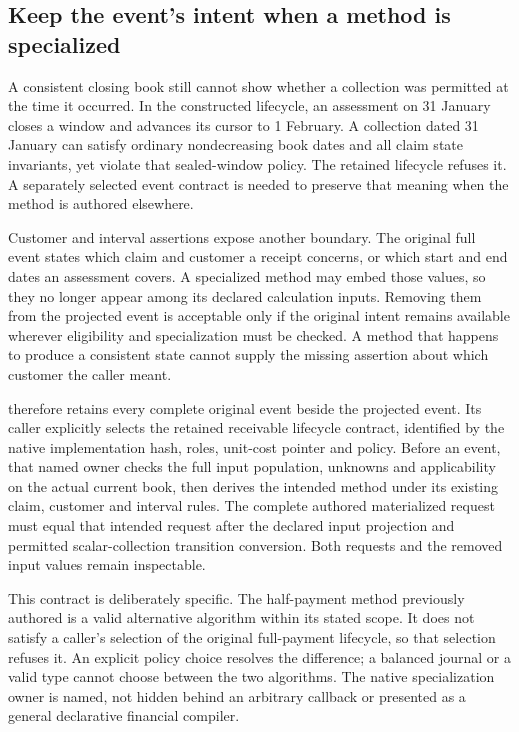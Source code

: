 \subsection{Keep the event's intent when a method is specialized}
\label{sec:authored-event-contract}

A consistent closing book still cannot show whether a collection was permitted
at the time it occurred. In the constructed lifecycle, an assessment on
31 January closes a window and advances its cursor to 1 February. A collection
dated 31 January can satisfy ordinary nondecreasing book dates and all claim
state invariants, yet violate that sealed-window policy. The retained lifecycle
refuses it. A separately selected event contract is needed to preserve that
meaning when the method is authored elsewhere.

Customer and interval assertions expose another boundary. The original full
event states which claim and customer a receipt concerns, or which start and
end dates an assessment covers. A specialized method may embed those values,
so they no longer appear among its declared calculation inputs. Removing them
from the projected event is acceptable only if the original intent remains
available wherever eligibility and specialization must be checked. A method
that happens to produce a consistent state cannot supply the missing assertion
about which customer the caller meant.

 therefore retains every complete
original event beside the projected event. Its caller explicitly selects the
retained receivable lifecycle contract, identified by the native implementation
hash, roles, unit-cost pointer and policy. Before an event, that named owner
checks the full input population, unknowns and applicability on the actual
current book, then derives the intended method under its existing claim,
customer and interval rules. The complete authored materialized request must
equal that intended request after the declared input projection and permitted
scalar-collection transition conversion. Both requests and the removed input
values remain inspectable.

This contract is deliberately specific. The half-payment method previously
authored is a valid alternative algorithm within its stated scope. It does not
satisfy a caller's selection of the original full-payment lifecycle, so that
selection refuses it. An explicit policy choice resolves the difference; a
balanced journal or a valid type cannot choose between the two algorithms.
The native specialization owner is named, not hidden behind an arbitrary
callback or presented as a general declarative financial compiler.

